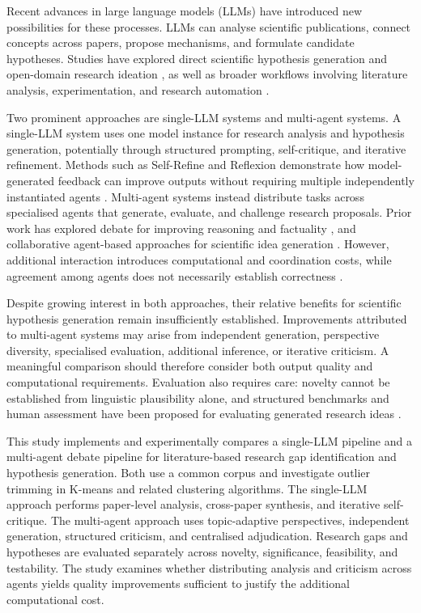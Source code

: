 \documentclass[sigconf,review,anonymous=false]{acmart}
\begin{document}
Recent advances in large language models (LLMs) have introduced new possibilities for these processes. LLMs can analyse scientific publications, connect concepts across papers, propose mechanisms, and formulate candidate hypotheses. Studies have explored direct scientific hypothesis generation and open-domain research ideation \cite{zhou2024hypothesis,yang2024large}, as well as broader workflows involving literature analysis, experimentation, and research automation \cite{lu2024ai,gottweis2025towards}.

Two prominent approaches are single-LLM systems and multi-agent systems. A single-LLM system uses one model instance for research analysis and hypothesis generation, potentially through structured prompting, self-critique, and iterative refinement. Methods such as Self-Refine and Reflexion demonstrate how model-generated feedback can improve outputs without requiring multiple independently instantiated agents \cite{madaan2023selfrefine,shinn2023reflexion}. Multi-agent systems instead distribute tasks across specialised agents that generate, evaluate, and challenge research proposals. Prior work has explored debate for improving reasoning and factuality \cite{du2024improving}, and collaborative agent-based approaches for scientific idea generation \cite{su2025many,ueda2025design,gottweis2025towards}. However, additional interaction introduces computational and coordination costs, while agreement among agents does not necessarily establish correctness \cite{smit2024mad,choi2025debatevote}.

Despite growing interest in both approaches, their relative benefits for scientific hypothesis generation remain insufficiently established. Improvements attributed to multi-agent systems may arise from independent generation, perspective diversity, specialised evaluation, additional inference, or iterative criticism. A meaningful comparison should therefore consider both output quality and computational requirements. Evaluation also requires care: novelty cannot be established from linguistic plausibility alone, and structured benchmarks and human assessment have been proposed for evaluating generated research ideas \cite{guo2025ideabench,qi2024biomedical,si2025novel}.

This study implements and experimentally compares a single-LLM pipeline and a multi-agent debate pipeline for literature-based research gap identification and hypothesis generation. Both use a common corpus and investigate outlier trimming in K-means and related clustering algorithms. The single-LLM approach performs paper-level analysis, cross-paper synthesis, and iterative self-critique. The multi-agent approach uses topic-adaptive perspectives, independent generation, structured criticism, and centralised adjudication. Research gaps and hypotheses are evaluated separately across novelty, significance, feasibility, and testability. The study examines whether distributing analysis and criticism across agents yields quality improvements sufficient to justify the additional computational cost.
\end{document}
